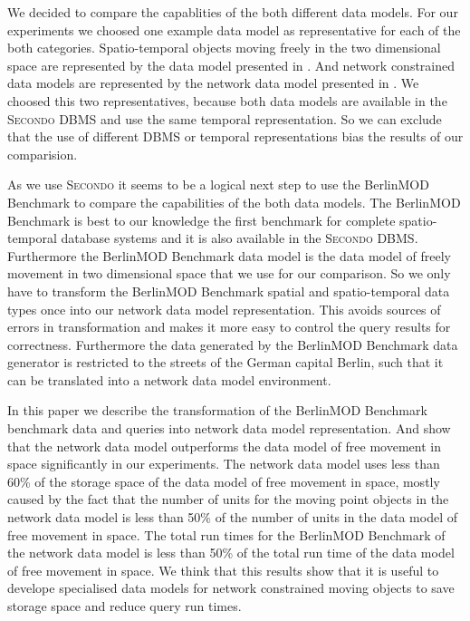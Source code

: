 \documentclass[a4paper]{article}
\newcommand{\secondo}{\textsc{Secondo}}
\newcommand{\bmodb} {BerlinMOD Benchmark}
\begin{document}
We decided to compare the capablities of the both different data models. For our
experiments we choosed one example data model as representative for
each of the both categories. Spatio-temporal objects moving freely in the two
dimensional space are represented by the data model presented in \cite{335426}.
And network constrained data models are represented by the network data model
presented in \cite{1146465}. We choosed this two representatives, because both
data models are available in the \secondo{} DBMS and use the same temporal
representation. So we can exclude that the use of different DBMS or temporal
representations bias the results of our comparision.

As we use \secondo{} it seems to be a logical next step to use the \bmodb{}
\cite{BerlinMODVLDB} to compare the capabilities of the
both data models. The \bmodb{} is best to our knowledge the first benchmark for
complete spatio-temporal database systems and it is also available in the \secondo{}
DBMS. Furthermore the \bmodb{} data model is the data model of freely movement
in two dimensional space that we use for our comparison. So we only have to
transform the \bmodb{} spatial and spatio-temporal data types once into our
network data model representation. This avoids sources of errors in transformation
and makes it more easy to control the query results for correctness. Furthermore
the data generated by the \bmodb{} data generator is restricted to the streets of the
German capital Berlin, such that it can be translated into a network data model
environment.

In this paper we describe the transformation of the \bmodb{} benchmark data and
queries into network data model representation. And show that the network data
model outperforms the data model of free movement in space significantly in our
experiments. The network data model uses less than 60\% of the storage space of
the data model of free movement in space, mostly caused by the fact that the number
of units for the moving point objects in the network data model is less than 50\% of
the number of units in the data model of free movement in space. The total run times
for the \bmodb{} of the network data model is less than 50\% of the total run time
of the data model of free movement in space. We think that this results show that
it is useful to develope specialised data models for network constrained moving objects
to save storage space and reduce query run times.

\end{document}

